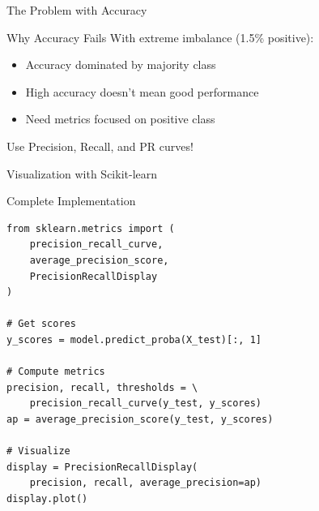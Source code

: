 \documentclass{beamer}
\begin{document}
\begin{frame}{The Problem with Accuracy}
\begin{keypointsbox}{Why Accuracy Fails}
\small
With extreme imbalance (1.5\% positive):
\begin{itemize}
    \item Accuracy dominated by majority class
    \item High accuracy doesn't mean good performance
    \item Need metrics focused on positive class
\end{itemize}
\end{keypointsbox}

\vspace{0.15cm}

\begin{center}
\Large
Use Precision, Recall, and PR curves!
\end{center}
\end{frame}

\begin{frame}[fragile]{Visualization with Scikit-learn}
\begin{block}{Complete Implementation}
\small
\begin{verbatim}
from sklearn.metrics import (
    precision_recall_curve,
    average_precision_score,
    PrecisionRecallDisplay
)

# Get scores
y_scores = model.predict_proba(X_test)[:, 1]

# Compute metrics
precision, recall, thresholds = \
    precision_recall_curve(y_test, y_scores)
ap = average_precision_score(y_test, y_scores)

# Visualize
display = PrecisionRecallDisplay(
    precision, recall, average_precision=ap)
display.plot()
\end{verbatim}
\end{block}
\end{frame}
\end{document}
